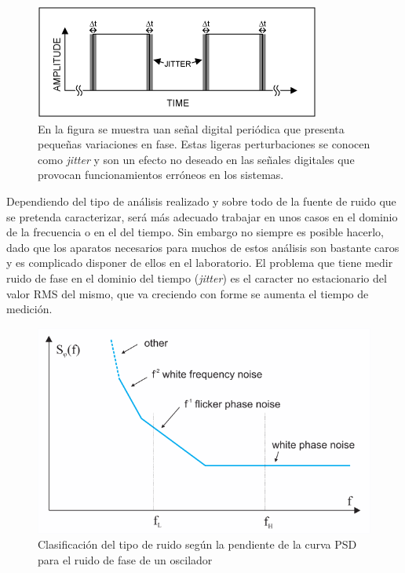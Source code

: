 \begin{figure}
	\centering
	\includegraphics[width=0.5\linewidth]{imagenes/jitter}
	\caption[Ilustración del fenómeno conocido como \textit{jitter}]{En la 
	figura se muestra uan señal digital periódica que presenta pequeñas 
	variaciones en fase. Estas ligeras perturbaciones se conocen como 
	\textit{jitter} y son un efecto no deseado en las señales digitales que 
	provocan funcionamientos erróneos en los sistemas.}
	\label{fig:jitter}
\end{figure}


Dependiendo del tipo de análisis realizado y sobre todo de 
la fuente de ruido que se pretenda caracterizar, será más adecuado trabajar en 
unos casos en el dominio de la frecuencia o en el del tiempo. Sin embargo no 
siempre es posible hacerlo, dado que los aparatos necesarios para muchos de 
estos análisis son bastante caros y es complicado disponer de ellos en el 
laboratorio.  El 
problema que tiene medir ruido de fase en el dominio del tiempo 
(\textit{jitter}) es el caracter no estacionario del valor RMS del mismo, que 
va creciendo con forme se aumenta el tiempo de medición.

\begin{figure}
	\centering
	\includegraphics[width=0.7\linewidth]{imagenes/psd_noise}
	\caption[Tipos de ruido en la curva PSD para un XO.]{Clasificación del tipo 
	de ruido según la pendiente de la curva PSD para el ruido de fase de un 
	oscilador}
	\label{fig:psdnoise}
\end{figure}

